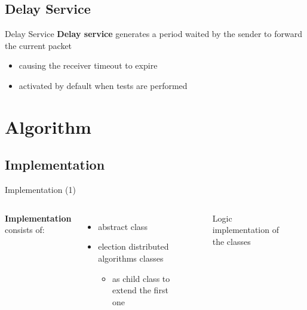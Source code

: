 \documentclass{beamer}
\begin{document}
        \subsection{Delay Service}
        
        \begin{frame}{Delay Service}
        \textbf{Delay service} generates a period waited by the sender to forward the current packet
        \begin{itemize}
            \item causing the receiver timeout to expire
        \end{itemize}
        \lstII
        \begin{itemize}
            \item activated by default when tests are performed
        \end{itemize}
	    \end{frame}
	    
	 \section{Algorithm}
	 
	 \subsection{Implementation}
	 
	 \begin{frame}{Implementation (1)}
	 
	 \begin{columns}
	 
	 \textbf{Implementation} consists of:
	 \begin{itemize}
	     \item abstract class
	     \item election distributed algorithms classes
	     \begin{itemize}
	         \item[\ding{113}] as child class to extend the first one
	     \end{itemize}
	 \end{itemize}
	 
    \begin{figure}
          \centering
          
          \caption{Logic implementation of the classes}
        \end{figure}
	     
	 \end{columns}
	     
	 \end{frame}
	 
\end{document}

